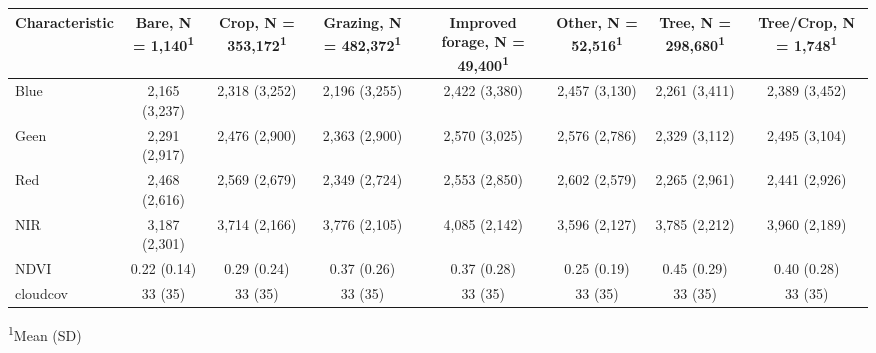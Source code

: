 \documentclass[10pt,a4paper,onecolumn]{article}
\begin{document}
\captionsetup[table]{labelformat=empty,skip=1pt}
\scriptsize
\begin{longtable}{lccccccc}
\toprule
\textbf{Characteristic} & \textbf{Bare}, N = 1,140\textsuperscript{1} & \textbf{Crop}, N = 353,172\textsuperscript{1} & \textbf{Grazing}, N = 482,372\textsuperscript{1} & \textbf{Improved forage}, N = 49,400\textsuperscript{1} & \textbf{Other}, N = 52,516\textsuperscript{1} & \textbf{Tree}, N = 298,680\textsuperscript{1} & \textbf{Tree/Crop}, N = 1,748\textsuperscript{1} \\ 
\midrule
Blue & 2,165 (3,237) & 2,318 (3,252) & 2,196 (3,255) & 2,422 (3,380) & 2,457 (3,130) & 2,261 (3,411) & 2,389 (3,452) \\ 
Geen & 2,291 (2,917) & 2,476 (2,900) & 2,363 (2,900) & 2,570 (3,025) & 2,576 (2,786) & 2,329 (3,112) & 2,495 (3,104) \\ 
Red & 2,468 (2,616) & 2,569 (2,679) & 2,349 (2,724) & 2,553 (2,850) & 2,602 (2,579) & 2,265 (2,961) & 2,441 (2,926) \\ 
NIR & 3,187 (2,301) & 3,714 (2,166) & 3,776 (2,105) & 4,085 (2,142) & 3,596 (2,127) & 3,785 (2,212) & 3,960 (2,189) \\ 
NDVI & 0.22 (0.14) & 0.29 (0.24) & 0.37 (0.26) & 0.37 (0.28) & 0.25 (0.19) & 0.45 (0.29) & 0.40 (0.28) \\ 
cloudcov & 33 (35) & 33 (35) & 33 (35) & 33 (35) & 33 (35) & 33 (35) & 33 (35) \\ 
 \bottomrule
\end{longtable}
\vspace{-5mm}
\begin{minipage}{\linewidth}
\textsuperscript{1}Mean (SD) \\ 
\end{minipage}
\end{document}
